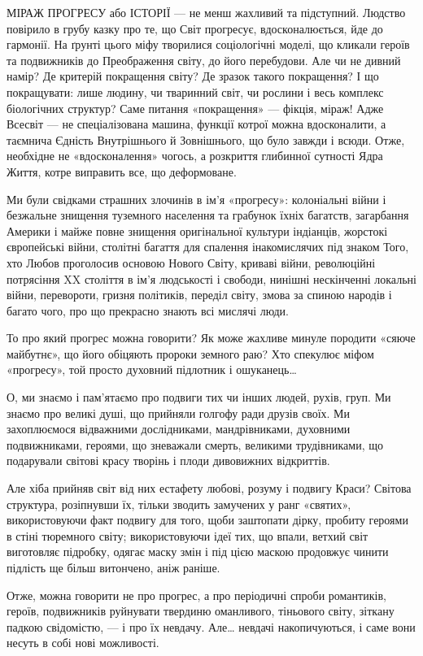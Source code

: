 МІРАЖ ПРОГРЕСУ або ІСТОРІЇ — не менш жахливий та підступний. Людство повірило в
грубу казку про те, що Світ прогресує, вдосконалюється, йде до гармонії. На
ґрунті цього міфу творилися соціологічні моделі, що кликали героїв та
подвижників до Преображення світу, до його перебудови. Але чи не дивний намір?
Де критерій покращення світу? Де зразок такого покращення? І що покращувати:
лише людину, чи тваринний світ, чи рослини і весь комплекс біологічних
структур? Саме питання «покращення» — фікція, міраж! Адже Всесвіт — не
спеціалізована машина, функції котрої можна вдосконалити, а таємнича Єдність
Внутрішнього й Зовнішнього, що було завжди і всюди. Отже, необхідне не
«вдосконалення» чогось, а розкриття глибинної сутності Ядра Життя, котре
виправить все, що деформоване.

Ми були свідками страшних злочинів в ім’я «прогресу»: колоніальні війни і
безжальне знищення туземного населення та грабунок їхніх багатств, загарбання
Америки і майже повне знищення оригінальної культури індіанців, жорстокі
європейські війни, столітні багаття для спалення інакомислячих під знаком Того,
хто Любов проголосив основою Нового Світу, криваві війни, революційні
потрясіння XX століття в ім’я людськості і свободи, нинішні нескінченні
локальні війни, перевороти, гризня політиків, переділ світу, змова за спиною
народів і багато чого, про що прекрасно знають всі мислячі люди.

То про який прогрес можна говорити? Як може жахливе минуле породити «сяюче
майбутнє», що його обіцяють пророки земного раю? Хто спекулює міфом «прогресу»,
той просто духовний підлотник і ошуканець…

О, ми знаємо і пам’ятаємо про подвиги тих чи інших людей, рухів, груп. Ми
знаємо про великі душі, що прийняли голгофу ради друзів своїх. Ми захоплюємося
відважними дослідниками, мандрівниками, духовними подвижниками, героями, що
зневажали смерть, великими трудівниками, що подарували світові красу творінь і
плоди дивовижних відкриттів.

Але хіба прийняв світ від них естафету любові, розуму і подвигу Краси? Світова
структура, розіпнувши їх, тільки зводить замучених у ранг «святих»,
використовуючи факт подвигу для того, щоби заштопати дірку, пробиту героями в
стіні тюремного світу; використовуючи ідеї тих, що впали, ветхий світ
виготовляє підробку, одягає маску змін і під цією маскою продовжує чинити
підлість ще більш витончено, аніж раніше.

Отже, можна говорити не про прогрес, а про періодичні спроби романтиків,
героїв, подвижників руйнувати твердиню оманливого, тіньового світу, зіткану
падкою свідомістю, — і про їх невдачу. Але… невдачі накопичуються, і саме вони
несуть в собі нові можливості.

